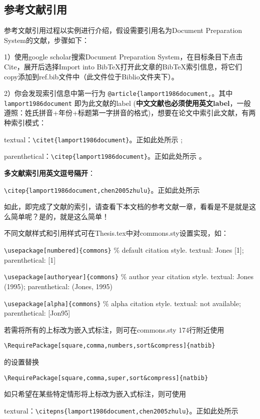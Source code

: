 \subsection{参考文献引用}

参考文献引用过程以实例进行介绍，假设需要引用名为Document Preparation System的文献，步骤如下：

1）使用google scholar搜索Document Preparation System，在目标条目下点击Cite，展开后选择Import into BibTeX打开此文章的BibTeX索引信息，将它们copy添加到ref.bib文件中（此文件位于Biblio文件夹下）。

2）你会发现索引信息中第一行为 \verb|@article{lamport1986document,|。其中 \verb|lamport1986document| 即为此文献的label (\textbf{中文文献也必须使用英文label}，一般遵照：姓氏拼音+年份+标题第一字拼音的格式)，想要在论文中索引此文献，有两种索引模式：

textual：\verb|\citet{lamport1986document}|。正如此处所示 \cite{lamport1986document}; 

parenthetical：\verb|\citep{lamport1986document}|。正如此处所示 \cite{lamport1986document}。

\textbf{多文献索引用英文逗号隔开}：

\verb|\citep{lamport1986document,chen2005zhulu}|。正如此处所示 \cite{lamport1986document,chen2005zhulu}

如此，即完成了文献的索引，请查看下本文档的参考文献一章，看看是不是就是这么简单呢？是的，就是这么简单！

不同文献样式和引用样式可在Thesis.tex中对commons.sty设置实现，如：

\verb+\usepackage[numbered]{commons}+ $\%$ default citation style. textual: Jones [1]; parenthetical: [1]

\verb+\usepackage[authoryear]{commons}+ $\%$ author year citation style. textual: Jones (1995); parenthetical: (Jones, 1995)

\verb+\usepackage[alpha]{commons}+ $\%$ alpha citation style. textual: not available; parenthetical: [Jon95]

若需将所有的上标改为嵌入式标注，则可在commons.sty 174行附近使用

\verb|\RequirePackage[square,comma,numbers,sort&compress]{natbib}|

的设置替换

\verb|\RequirePackage[square,comma,super,sort&compress]{natbib}|

如只希望在某些特定情形将上标改为嵌入式标注，则可使用

textural：\verb|\citepns{lamport1986document,chen2005zhulu}|。正如此处所示\cite{lamport1986document,chen2005zhulu}

